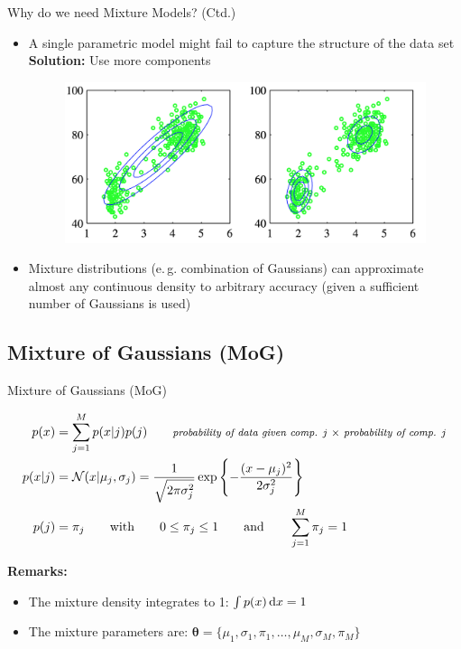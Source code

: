 \begin{frame}{Why do we need Mixture Models? (Ctd.)}{}
	\begin{itemize}
		\item A single parametric model might fail to capture the structure of the data set \\
			\textbf{Solution:} Use more components
		\begin{figure}
			\centering
			\includegraphics[scale=0.3]{04_density_estimation/02_img/mixture_models.png}
		\end{figure}
		\item Mixture distributions (e.\,g. combination of Gaussians) can approximate almost any continuous density to arbitrary accuracy (given a sufficient number of Gaussians is used)
	\end{itemize}
\end{frame}


\subsection{Mixture of Gaussians (MoG)}

\begin{frame}{Mixture of Gaussians (MoG)}{}
	\vspace*{-6mm}
	{\footnotesize
	\begin{align}
		p(x) 
			&= \sum_{j=1}^M p(x \vert j) p(j) \qquad\text{\footnotesize \textit{probability of data given comp. $j$ $\times$ probability of comp. $j$}} \\
		p(x|j)
			&= \mathcal{N}(x \vert \mu_j, \sigma_j) = \frac{1}{\sqrt{2 \pi\sigma_j^2}} \exp \left\{ -\frac{(x - \mu_j)^2}{2\sigma_j^2} \right\} \\
		p(j) 
			&= \pi_j \qquad\text{with}\qquad 0 \le \pi_j \le 1 \qquad\text{and}\qquad \sum_{j=1}^M \pi_j = 1
	\end{align}
	
	\vspace*{-3mm}
	\textbf{Remarks:}
	\begin{itemize}
		\item The mixture density integrates to 1: $\int p(x) \mathop{}\!\mathrm{d} x = 1$
		\item The mixture parameters are: $\bm{\theta} = \{ \mu_1, \sigma_1, \pi_1, \dots, \mu_M, \sigma_M, \pi_M \}$
	\end{itemize}}
\end{frame}


